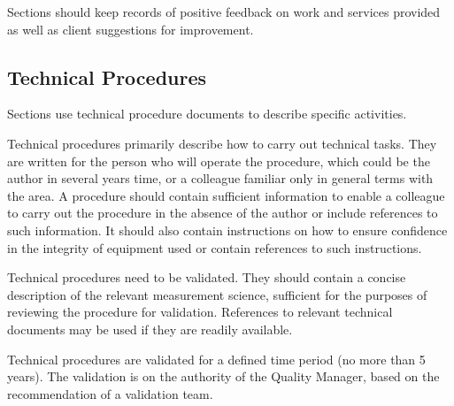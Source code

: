 Sections should keep records of positive feedback on work and services provided as well as client suggestions for improvement.

\subsection{Technical Procedures}
\label{ss:technical_procedures}
Sections use technical procedure documents to describe specific activities.

Technical procedures primarily describe how to carry out technical tasks. They are written for the person who will operate the procedure, which could be the author in several years time, or a colleague familiar only in general terms with the area. A procedure should contain sufficient information to enable a colleague to carry out the procedure in the absence of the author or include references to such information. It should also contain instructions on how to ensure confidence in the integrity of equipment used or contain references to such instructions.

Technical procedures need to be validated. They should contain a concise description of the relevant measurement science, sufficient for the purposes of reviewing the procedure for validation. References to relevant technical documents may be used if they are readily available. 

Technical procedures are validated for a defined time period (no more than 5 years). The validation is on the authority of the Quality Manager, based on the recommendation of a validation team. 

